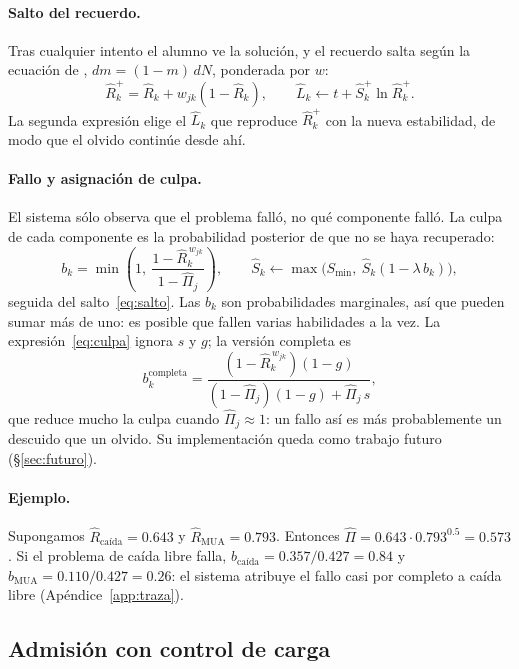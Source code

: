 \documentclass[11pt]{article}
\theoremstyle{definition}
\theoremstyle{remark}
\newcommand{\Rh}{\hat R}
\newcommand{\Sh}{\hat S}
\newcommand{\Lh}{\hat L}
\newcommand{\Pih}{\hat\Pi}
\newcommand{\Smin}{S_{\min}}
\begin{document}
\paragraph{Salto del recuerdo.} Tras cualquier intento el alumno ve la solución, y el recuerdo salta según la ecuación de \citet{tabibian2019}, $dm=(1-m)\,dN$, ponderada por $w$:
\begin{equation}
\Rh_k^{+}=\Rh_k+w_{jk}(1-\Rh_k),\qquad \Lh_k\leftarrow t+\Sh_k^{+}\ln\Rh_k^{+}.
\label{eq:salto}
\end{equation}
La segunda expresión elige el $\Lh_k$ que reproduce $\Rh_k^+$ con la nueva estabilidad, de modo que el olvido continúe desde ahí.

\paragraph{Fallo y asignación de culpa.} El sistema sólo observa que el problema falló, no qué componente falló. La culpa de cada componente es la probabilidad posterior de que no se haya recuperado:
\begin{equation}
b_k=\min\!\left(1,\ \frac{1-\Rh_k^{\,w_{jk}}}{1-\Pih_j}\right),\qquad
\Sh_k\leftarrow\max\bigl(\Smin,\ \Sh_k(1-\lambda\,b_k)\bigr),
\label{eq:culpa}
\end{equation}
seguida del salto~\eqref{eq:salto}. Las $b_k$ son probabilidades marginales, así que pueden sumar más de uno: es posible que fallen varias habilidades a la vez. La expresión~\eqref{eq:culpa} ignora $s$ y $g$; la versión completa es
\begin{equation}
b_k^{\mathrm{completa}}=\frac{(1-\Rh_k^{\,w_{jk}})(1-g)}{(1-\Pih_j)(1-g)+\Pih_j\,s},
\label{eq:culpa-completa}
\end{equation}
que reduce mucho la culpa cuando $\Pih_j\approx1$: un fallo así es más probablemente un descuido que un olvido. Su implementación queda como trabajo futuro (\S\ref{sec:futuro}).

\paragraph{Ejemplo.} Supongamos $\Rh_{\text{caída}}=0.643$ y $\Rh_{\text{MUA}}=0.793$. Entonces $\Pih=0.643\cdot0.793^{0.5}=0.573$. Si el problema de caída libre falla, $b_{\text{caída}}=0.357/0.427=0.84$ y $b_{\text{MUA}}=0.110/0.427=0.26$: el sistema atribuye el fallo casi por completo a caída libre (Apéndice~\ref{app:traza}).

\subsection{Admisión con control de carga}
\label{sec:admision}
\end{document}
